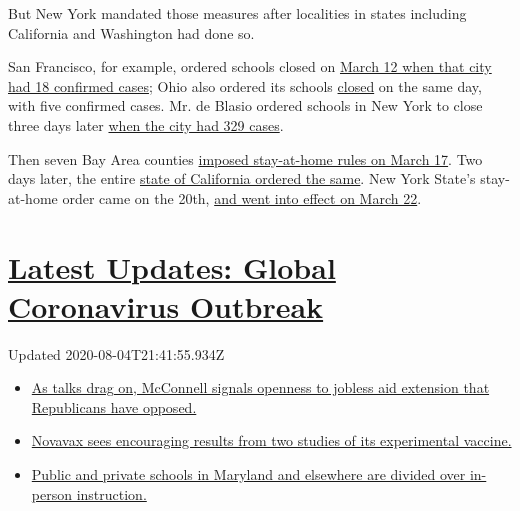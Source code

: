 But New York mandated those measures after localities in states
including California and Washington had done so.

San Francisco, for example, ordered schools closed on
\href{https://www.kron4.com/health/coronavirus/san-francisco-reports-4-new-coronavirus-cases-bringing-total-to-18/}{March
12 when that city had 18 confirmed cases}; Ohio also ordered its schools
\href{https://www.usnews.com/news/education-news/articles/2020-03-12/ohio-gov-mike-dewine-orders-all-k-12-schools-closed}{closed}
on the same day, with five confirmed cases. Mr. de Blasio ordered
schools in New York to close three days later
\href{https://www.governor.ny.gov/news/governor-cuomo-calls-president-trump-take-comprehensive-federal-action-combat-novel-coronavirus}{when
the city had 329 cases}.

Then seven Bay Area counties
\href{https://www.nytimes3xbfgragh.onion/2020/03/16/us/california-covid-19.html}{imposed
stay-at-home rules on March 17}. Two days later, the entire
\href{https://www.nytimes3xbfgragh.onion/2020/03/19/us/California-stay-at-home-order-virus.html}{state
of California ordered the same}. New York State's stay-at-home order
came on the 20th,
\href{https://www.nytimes3xbfgragh.onion/2020/03/20/us/ny-ca-stay-home-order.html}{and
went into effect on March 22}.

\hypertarget{latest-updates-global-coronavirus-outbreak}{%
\section{\texorpdfstring{\href{https://www.nytimes3xbfgragh.onion/2020/08/04/world/coronavirus-cases.html?action=click\&pgtype=Article\&state=default\&region=MAIN_CONTENT_1\&context=storylines_live_updates}{Latest
Updates: Global Coronavirus
Outbreak}}{Latest Updates: Global Coronavirus Outbreak}}\label{latest-updates-global-coronavirus-outbreak}}

Updated 2020-08-04T21:41:55.934Z

\begin{itemize}
\tightlist
\item
  \href{https://www.nytimes3xbfgragh.onion/2020/08/04/world/coronavirus-cases.html?action=click\&pgtype=Article\&state=default\&region=MAIN_CONTENT_1\&context=storylines_live_updates\#link-2daa96b5}{As
  talks drag on, McConnell signals openness to jobless aid extension
  that Republicans have opposed.}
\item
  \href{https://www.nytimes3xbfgragh.onion/2020/08/04/world/coronavirus-cases.html?action=click\&pgtype=Article\&state=default\&region=MAIN_CONTENT_1\&context=storylines_live_updates\#link-1228a480}{Novavax
  sees encouraging results from two studies of its experimental
  vaccine.}
\item
  \href{https://www.nytimes3xbfgragh.onion/2020/08/04/world/coronavirus-cases.html?action=click\&pgtype=Article\&state=default\&region=MAIN_CONTENT_1\&context=storylines_live_updates\#link-4825b93}{Public
  and private schools in Maryland and elsewhere are divided over
  in-person instruction.}
\end{itemize}

